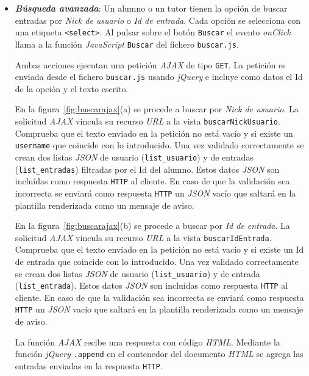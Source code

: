 \documentclass[a4paper, 12pt]{book}
\begin{document}
\begin{itemize}
  
  \item {\bfseries \textit{B\'usqueda avanzada}}: Un alumno o un tutor tienen la opci\'on de buscar entradas por \textit{Nick de usuario} o 
  \textit{Id de entrada}. Cada opci\'on se selecciona con una etiqueta \texttt{<select>}. Al pulsar sobre el bot\'on \texttt{Buscar} el evento 
  \textit{onClick} llama a la funci\'on \textit{JavaScript} \texttt{Buscar} del fichero \texttt{buscar.js}. 
  
  Ambas acciones ejecutan una petici\'on \textit{AJAX} de tipo \texttt{GET}. La petici\'on es enviada desde el fichero \texttt{buscar.js} usando 
  \textit{jQuery} e incluye como datos el Id de la opci\'on y el texto escrito.

  En la figura~\ref{fig:buscarajax}(a) se procede a buscar por \textit{Nick de usuario}. La solicitud \textit{AJAX} vincula su recurso \textit{URL} a la 
  vista \texttt{buscarNickUsuario}. Comprueba que el texto enviado en la petici\'on no est\'a vac\'io y si existe un \texttt{username} que coincide con lo
  introducido. Una vez validado correctamente se crean dos listas \textit{JSON} de usuario (\texttt{list\_usuario}) y de entradas (\texttt{list\_entradas}) 
  filtradas por el Id del alumno. Estos datos \textit{JSON} son inclu\'idas como respuesta \texttt{HTTP} al cliente. En caso de que la validaci\'on sea incorrecta 
  se enviar\'a como respuesta \texttt{HTTP} un \textit{JSON} vac\'io que saltar\'a en la plantilla renderizada como un mensaje de aviso.

  En la figura~\ref{fig:buscarajax}(b) se procede a buscar por \textit{Id de entrada}. La solicitud \textit{AJAX} vincula su recurso \textit{URL} a la 
  vista \texttt{buscarIdEntrada}. Comprueba que el texto enviado en la petici\'on no est\'a vac\'io y si existe un Id de entrada que coincide con lo
  introducido. Una vez validado correctamente se crean dos listas \textit{JSON} de usuario (\texttt{list\_usuario}) y de entrada (\texttt{list\_entrada}). 
  Estos datos \textit{JSON} son inclu\'idas como respuesta \texttt{HTTP} al cliente. En caso de que la validaci\'on sea incorrecta se enviar\'a como respuesta \texttt{HTTP} 
  un \textit{JSON} vac\'io que saltar\'a en la plantilla renderizada como un mensaje de aviso.
  
  La funci\'on \textit{AJAX} recibe una respuesta con c\'odigo \textit{HTML}. Mediante la funci\'on \textit{jQuery} \texttt{.append} en el contenedor del documento 
  \textit{HTML} se agrega las entradas enviadas en la respuesta \texttt{HTTP}.
  

\end{itemize}
\end{document}
